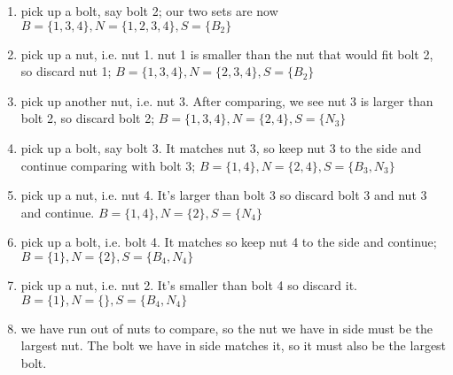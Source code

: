\documentclass[12pt]{article}
\begin{document}
\begin{enumerate}
    \begin{enumerate}
        \item pick up a bolt, say bolt 2; our two sets are now $B = \{1, 3, 4\}, N = \{1, 2, 3, 4\}, S = \{B_2\}$
        \item pick up a nut, i.e. nut 1. nut 1 is smaller than the nut that would fit bolt 2, so discard nut 1; $B = \{1, 3, 4\}, N = \{2, 3, 4\}, S = \{B_2\}$
        \item pick up another nut, i.e. nut 3. After comparing, we see nut 3 is larger than bolt 2, so discard bolt 2; $B = \{1, 3, 4\}, N = \{2, 4\}, S = \{N_3\}$
        \item pick up a bolt, say bolt 3. It matches nut 3, so keep nut 3 to the side and continue comparing with bolt 3; $B = \{1, 4\}, N = \{2, 4\}, S = \{B_3, N_3\}$
        \item pick up a nut, i.e. nut 4. It's larger than bolt 3 so discard bolt 3 and nut 3 and continue. $B = \{1, 4\}, N = \{2\}, S = \{N_4\}$
        \item pick up a bolt, i.e. bolt 4. It matches so keep nut 4 to the side and continue; $B = \{1\}, N = \{2\}, S = \{B_4, N_4\}$
        \item pick up a nut, i.e. nut 2. It's smaller than bolt 4 so discard it. $B = \{1\}, N = \{\}, S = \{B_4, N_4\}$
        \item we have run out of nuts to compare, so the nut we have in side must be the largest nut. The bolt we have in side matches it, 
        so it must also be the largest bolt.
    \end{enumerate}
\end{enumerate}
\end{document}
